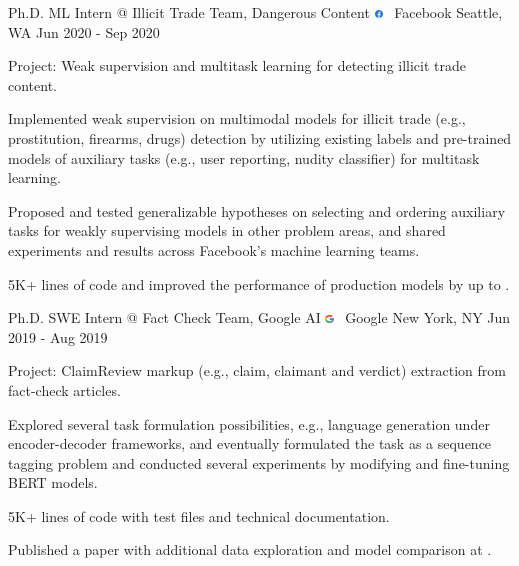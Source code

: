 \documentclass[letterpaper]{awesome-cv}
\begin{document}
\addvspace{0.2ex}
\begin{cventries}
  \cventry
    {Ph.D. ML Intern @ Illicit Trade Team, Dangerous Content}
    {\includegraphics[width=0.016\textwidth]{../images/logos/facebook.png}~ Facebook}
    {Seattle, WA}
    {Jun 2020 - Sep 2020}
    {
      \begin{cvitems}
        \item {Project: Weak supervision and multitask learning for detecting illicit trade content.}
        \item {Implemented weak supervision on multimodal models for illicit trade (e.g., prostitution, firearms, drugs) detection by utilizing existing labels and pre-trained models of auxiliary tasks (e.g., user reporting, nudity classifier) for multitask learning.}
        \item {Proposed and tested generalizable hypotheses on selecting and ordering auxiliary tasks for weakly supervising models in other problem areas, and shared experiments and results across Facebook's machine learning teams.}
        \item { 5K+ lines of code and improved the performance of production models by up to .}
      \end{cvitems}
    }
  \cventry
    {Ph.D. SWE Intern @ Fact Check Team, Google AI}
    {\includegraphics[width=0.016\textwidth]{../images/logos/google.png}~ Google}
    {New York, NY}
    {Jun 2019 - Aug 2019}
    {
      \begin{cvitems}
        \item {Project: ClaimReview markup (e.g., claim, claimant and verdict) extraction from fact-check articles.}
        \item {Explored several task formulation possibilities, e.g., language generation under encoder-decoder frameworks, and eventually formulated the task as a sequence tagging problem and conducted several experiments by modifying and fine-tuning BERT models.}
        \item { 5K+ lines of code with test files and technical documentation.}
        \item {Published a paper with additional data exploration and model comparison at .}

\end{cvitems}}
\end{cventries}
\end{document}

